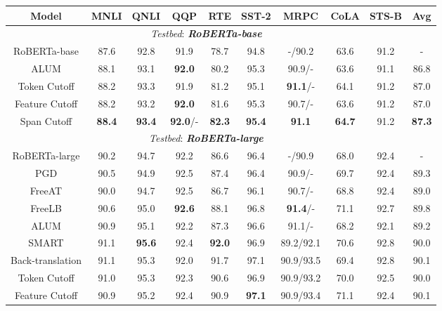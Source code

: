 \documentclass[11pt,a4paper]{article}
\newcommand{\tf}[1]{\textbf{#1}}
\begin{document}
\begin{table*}[ht!]
	\centering
	\begin{small}
		\vspace{0mm}
		\setlength{\tabcolsep}{6pt}
		\def\arraystretch{1.05}
		\begin{tabular}{c||c|c|c|c|c|c|c|c|c}
			\toprule[1.2pt]
\tf{Model} & \tf{MNLI} & \tf{QNLI}    & \tf{QQP} & \tf{RTE}  & \tf{SST-2} & \tf{MRPC}  & \tf{CoLA} & \tf{STS-B} & \tf{Avg} \\
			\hline
			\multicolumn{9}{c}{\emph{Testbed}: \emph{\textbf{RoBERTa-base}}} \\
			\hline
			RoBERTa-base  & 87.6 & 92.8  & 91.9  & 78.7  & 94.8  & -/90.2 & 63.6 & 91.2 & - \\
			ALUM & 88.1 & 93.1  & \textbf{92.0}  & 80.2  & 95.3  & 90.9/- & 63.6 & 91.1 & 86.8 \\
			\hline
			 Token Cutoff & 88.2 & 93.3  &91.9  &  81.2 & 95.1 & \textbf{91.1}/-  & 64.1 & 91.2 & 87.0 \\
			 Feature Cutoff & 88.2 & 93.2  & \textbf{92.0} &  81.6 & 95.3 & 90.7/- & 63.6 & 91.2 & 87.0 \\
			 Span Cutoff & \textbf{88.4} & \textbf{93.4}  & \textbf{92.0}/-  &  \textbf{82.3} & \textbf{95.4} & \textbf{91.1} & \textbf{64.7} & 91.2 & \textbf{87.3} \\
			\hline 
			\multicolumn{9}{c}{\emph{Testbed}: \emph{\textbf{RoBERTa-large}}} \\
			\hline 
			RoBERTa-large & 90.2 & 94.7  & 92.2  & 86.6 & 96.4 & -/90.9 & 68.0 & 92.4 & - \\
			PGD  & 90.5 & 94.9  & 92.5  & 87.4 & 96.4 & 90.9/- & 69.7 & 92.4 & 89.3 \\
			FreeAT  & 90.0 & 94.7  & 92.5  & 86.7 & 96.1 & 90.7/- & 68.8 & 92.4 & 89.0  \\
			FreeLB   & 90.6 & 95.0  & \textbf{92.6}  & 88.1 & 96.8 & \textbf{91.4}/- & 71.1 & 92.7 & 89.8 \\
			ALUM & 90.9 & 95.1  & 92.2  & 87.3 & 96.6 & 91.1/- & 68.2 & 92.1 & 89.2  \\
			SMART  & 91.1 & \textbf{95.6}  & 92.4  & \textbf{92.0} & 96.9 & 89.2/92.1 & 70.6 & 92.8 & 90.0 \\
			Back-translation  & 91.1 & 95.3  & 92.0  & 91.7 & 97.1 & 90.9/93.5 & 69.4 & 92.8 & 90.1  \\
			\hline
			Token Cutoff & 91.0 & 95.3  & 92.3  & 90.6 & 96.9 & 90.9/93.2 & 70.0 & 92.5 & 90.0 \\
			Feature Cutoff  & 90.9 & 95.2  & 92.4  & 90.9 & \textbf{97.1} & 90.9/93.4 & 71.1 & 92.4 & 90.1 \\

\end{tabular}
\end{small}
\end{table*}
\end{document}
